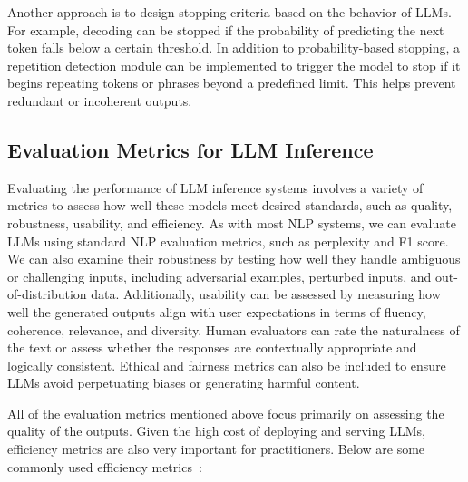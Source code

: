 Another approach is to design stopping criteria based on the behavior of LLMs. For example, decoding can be stopped if the probability of predicting the next token falls below a certain threshold. In addition to probability-based stopping, a repetition detection module can be implemented to trigger the model to stop if it begins repeating tokens or phrases beyond a predefined limit. This helps prevent redundant or incoherent outputs.

\subsection{Evaluation Metrics for LLM Inference}

Evaluating the performance of LLM inference systems involves a variety of metrics to assess how well these models meet desired standards, such as quality, robustness, usability, and efficiency. As with most NLP systems, we can evaluate LLMs using standard NLP evaluation metrics, such as perplexity and F1 score. We can also examine their robustness by testing how well they handle ambiguous or challenging inputs, including adversarial examples, perturbed inputs, and out-of-distribution data. Additionally, usability can be assessed by measuring how well the generated outputs align with user expectations in terms of fluency, coherence, relevance, and diversity. Human evaluators can rate the naturalness of the text or assess whether the responses are contextually appropriate and logically consistent. Ethical and fairness metrics can also be included to ensure LLMs avoid perpetuating biases or generating harmful content.

All of the evaluation metrics mentioned above focus primarily on assessing the quality of the outputs. Given the high cost of deploying and serving LLMs, efficiency metrics are also very important for practitioners. Below are some commonly used efficiency metrics~\cite{nvidia-nim-llm-benchmarking}:

